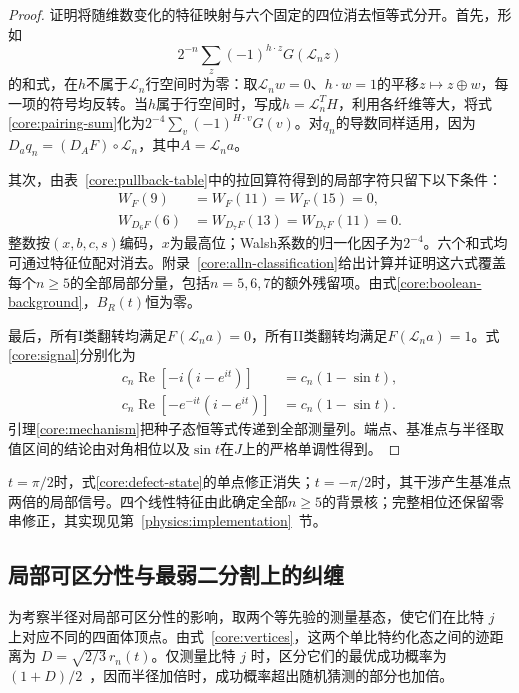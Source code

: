\begin{proof}
证明将随维数变化的特征映射与六个固定的四位消去恒等式分开。首先，形如
\begin{equation}
 2^{-n}\sum_z(-1)^{h\cdot z}G(\mathcal L_nz)
 \label{core:pairing-sum}
\end{equation}
的和式，在$h$不属于$\mathcal L_n$行空间时为零：取$\mathcal L_nw=0$、$h\cdot w=1$的平移$z\mapsto z\oplus w$，每一项的符号均反转。当$h$属于行空间时，写成$h=\mathcal L_n^TH$，利用各纤维等大，将式\eqref{core:pairing-sum}化为$2^{-4}\sum_v(-1)^{H\cdot v}G(v)$。对$q_n$的导数同样适用，因为$D_aq_n=(D_AF)\circ\mathcal L_n$，其中$A=\mathcal L_na$。

其次，由表~\ref{core:pullback-table}中的拉回算符得到的局部字符只留下以下条件：
\begin{align}
 W_F(9)&=W_F(11)=W_F(15)=0,\nonumber\\
 W_{D_6F}(6)&=W_{D_7F}(13)=W_{D_7F}(11)=0.
 \label{core:six-cancellations}
\end{align}
整数按$(x,b,c,s)$编码，$x$为最高位；Walsh系数的归一化因子为$2^{-4}$。六个和式均可通过特征位配对消去。附录~\ref{core:alln-classification}给出计算并证明这六式覆盖每个$n\ge5$的全部局部分量，包括$n=5,6,7$的额外残留项。由式\eqref{core:boolean-background}，$B_R(t)$恒为零。

最后，所有I类翻转均满足$F(\mathcal L_na)=0$，所有II类翻转均满足$F(\mathcal L_na)=1$。式\eqref{core:signal}分别化为
\begin{align}
 c_n\operatorname{Re}[-i(i-e^{it})]&=c_n(1-\sin t),\nonumber\\
 c_n\operatorname{Re}[-e^{-it}(i-e^{it})]&=c_n(1-\sin t).
\end{align}
引理\ref{core:mechanism}把种子态恒等式传递到全部测量列。端点、基准点与半径取值区间的结论由对角相位以及$\sin t$在$J$上的严格单调性得到。
\end{proof}

$t=\pi/2$时，式\eqref{core:defect-state}的单点修正消失；$t=-\pi/2$时，其干涉产生基准点两倍的局部信号。四个线性特征由此确定全部$n\ge5$的背景核；完整相位还保留零串修正，其实现见第~\ref{physics:implementation}~节。

\subsection{局部可区分性与最弱二分割上的纠缠}
\label{physics:entanglement}

为考察半径对局部可区分性的影响，取两个等先验的测量基态，使它们在比特 $j$ 上对应不同的四面体顶点。由式~\eqref{core:vertices}，这两个单比特约化态之间的迹距离为 $D=\sqrt{2/3}\,r_n(t)$。仅测量比特 $j$ 时，区分它们的最优成功概率为 $(1+D)/2$~\cite{Helstrom1967}，因而半径加倍时，成功概率超出随机猜测的部分也加倍。

